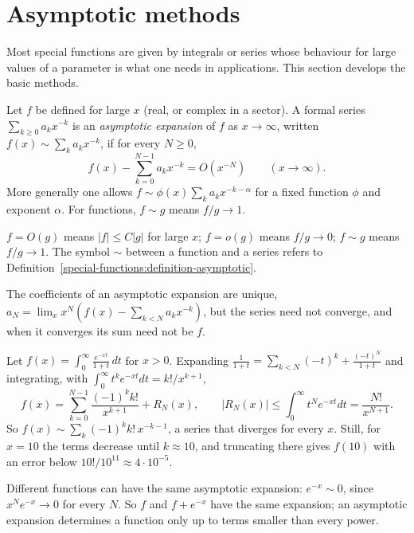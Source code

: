 \section{Asymptotic methods}\label{special-functions:section-asymptotics}

Most special functions are given by integrals or series whose behaviour for large values of a parameter is what one needs in applications. This section develops the basic methods.

\begin{definition}\label{special-functions:definition-asymptotic}
Let $f$ be defined for large $x$ (real, or complex in a sector). A formal series $\sum_{k \geq 0}a_kx^{-k}$ is an \emph{asymptotic expansion} of $f$ as $x \to \infty$, written $f(x) \sim \sum_ka_kx^{-k}$, if for every
$N \geq 0$,
\[
f(x) - \sum_{k=0}^{N-1}a_kx^{-k} = O(x^{-N}) \qquad (x \to \infty).
\]
More generally one allows $f \sim \phi(x)\sum_ka_kx^{-k-\alpha}$ for a fixed function $\phi$ and exponent $\alpha$. For functions, $f \sim g$ means $f/g \to 1$.
\end{definition}

\begin{notation}\label{special-functions:notation-asymptotic}
$f = O(g)$ means $|f| \leq C|g|$ for large $x$; $f = o(g)$ means $f/g \to 0$; $f \sim g$ means $f/g \to 1$. The symbol $\sim$ between a function and a series refers to
Definition~\ref{special-functions:definition-asymptotic}.
\end{notation}

The coefficients of an asymptotic expansion are unique, $a_N = \lim_xx^N(f(x) - \sum_{k<N}a_kx^{-k})$, but the series need not converge, and when it converges its sum need not be $f$.

\begin{example}\label{special-functions:example-stieltjes}
Let $f(x) = \int_0^\infty\frac{e^{-xt}}{1 + t}\,dt$ for $x > 0$. Expanding $\frac{1}{1 + t} = \sum_{k<N}(-t)^k + \frac{(-t)^N}{1 + t}$ and integrating, with $\int_0^\infty t^ke^{-xt}dt = k!/x^{k+1}$,
\[
f(x) = \sum_{k=0}^{N-1}\frac{(-1)^kk!}{x^{k+1}} + R_N(x), \qquad |R_N(x)| \leq \int_0^\infty t^Ne^{-xt}dt = \frac{N!}{x^{N+1}}.
\]
So $f(x) \sim \sum_k(-1)^kk!\,x^{-k-1}$, a series that diverges for every $x$. Still, for $x = 10$ the terms decrease until $k \approx 10$, and truncating there gives $f(10)$ with an error below $10!/10^{11} \approx 4 \cdot 10^{-5}$.
\end{example}

\begin{counterexample}\label{special-functions:counterexample-asymptotic-not-unique}
Different functions can have the same asymptotic expansion: $e^{-x} \sim 0$, since $x^Ne^{-x} \to 0$ for every $N$. So $f$ and $f + e^{-x}$ have the same expansion; an asymptotic expansion determines a function only
up to terms smaller than every power.
\end{counterexample}

